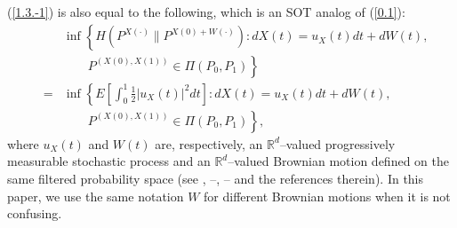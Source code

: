 \documentclass[12pt]{article}
\begin{document}
(\ref{1.3.-1}) is also equal to the following, which is an  SOT  analog of (\ref{0.1}):
\begin{eqnarray}
&&\inf\left\{H(P^{X(\cdot)}\|P^{X(0)+W(\cdot)}):dX(t)=u_X(t)dt +dW(t), \right.\nonumber\\
&&\qquad \left. P^{(X(0), X(1))}\in \Pi(P_0,P_1)\right\}\nonumber\\
&=&\inf\left\{E\left[\int_0^1\frac{1}{2}\left|u_X(t)\right|^2dt\right]:dX(t)=u_X(t)dt +dW(t), \right.\label{1.3.0}\\
&&\qquad \left. P^{(X(0), X(1))}\in \Pi(P_0,P_1)\right\},\nonumber
\end{eqnarray}
where $u_X(t)$ and $W(t)$ are, respectively, an $\mathbb{R}^d$--valued progressively measurable stochastic process
and an $\mathbb{R}^d$--valued  Brownian motion defined on the same filtered probability space
(see \cite{D91, F88}, \cite{J75}--\cite{MT06}, \cite{Z86}--\cite{Z86-3}
and the references therein).
 In this paper, we use the same notation $W$ for different  Brownian motions when it is not confusing.
\end{document}
